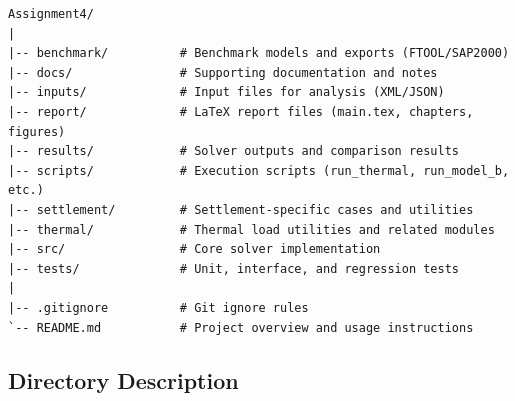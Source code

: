 \begin{verbatim}
Assignment4/
|
|-- benchmark/          # Benchmark models and exports (FTOOL/SAP2000)
|-- docs/               # Supporting documentation and notes
|-- inputs/             # Input files for analysis (XML/JSON)
|-- report/             # LaTeX report files (main.tex, chapters, figures)
|-- results/            # Solver outputs and comparison results
|-- scripts/            # Execution scripts (run_thermal, run_model_b, etc.)
|-- settlement/         # Settlement-specific cases and utilities
|-- thermal/            # Thermal load utilities and related modules
|-- src/                # Core solver implementation
|-- tests/              # Unit, interface, and regression tests
|
|-- .gitignore          # Git ignore rules
`-- README.md           # Project overview and usage instructions
\end{verbatim}

\subsection{Directory Description}

